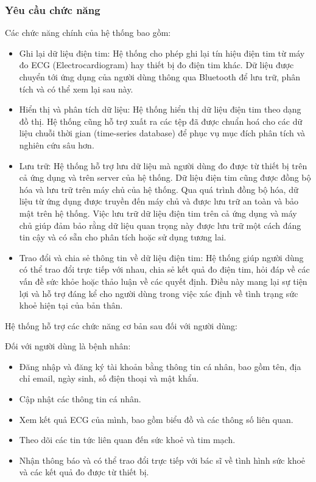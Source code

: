 \subsubsection{Yêu cầu chức năng}
Các chức năng chính của hệ thống bao gồm: 
\begin{adjustwidth}{2em}{}
  \begin{itemize}
      \item Ghi lại dữ liệu điện tim: Hệ thống cho phép ghi lại tín hiệu điện tim từ máy đo ECG (Electrocardiogram) hay thiết bị đo điện tim khác. Dữ liệu được chuyển tới ứng dụng của người dùng thông qua Bluetooth để lưu trữ, phân tích và có thể xem lại sau này.
  
      \item Hiển thị và phân tích dữ liệu: Hệ thống hiển thị dữ liệu điện tim theo dạng đồ thị. Hệ thống cũng hỗ trợ xuất ra các tệp đã được chuẩn hoá cho các dữ liệu chuỗi thời gian (time-series database) để phục vụ mục đích phân tích và nghiên cứu sâu hơn.
  
      \item Lưu trữ: Hệ thống hỗ trợ lưu dữ liệu mà người dùng đo được từ thiết bị trên cả ứng dụng và trên server của hệ thống. Dữ liệu điện tim cũng được đồng bộ hóa và lưu trữ trên máy chủ của hệ thống. Qua quá trình đồng bộ hóa, dữ liệu từ ứng dụng được truyền đến máy chủ và được lưu trữ an toàn và bảo mật trên hệ thống. Việc lưu trữ dữ liệu điện tim trên cả ứng dụng và máy chủ giúp đảm bảo rằng dữ liệu quan trọng này được lưu trữ một cách đáng tin cậy và có sẵn cho phân tích hoặc sử dụng tương lai.
  
      \item Trao đổi và chia sẻ thông tin về dữ liệu điện tim: Hệ thống giúp người dùng có thể trao đổi trực tiếp với nhau, chia sẻ kết quả đo điện tim, hỏi đáp về các vấn đề sức khỏe hoặc thảo luận về các quyết định. Điều này mang lại sự tiện lợi và hỗ trợ đáng kể cho người dùng trong việc xác định về tình trạng sức khoẻ hiện tại của bản thân.
  \end{itemize}
  \end{adjustwidth}
  
  

  
  
Hệ thống hỗ trợ các chức năng cơ bản sau đối với người dùng:

Đối với người dùng là bệnh nhân:
\begin{itemize}
    \item Đăng nhập và đăng ký tài khoản bằng thông tin cá nhân, bao gồm tên, địa chỉ email, ngày sinh, số điện thoại và mật khẩu.
    \item Cập nhật các thông tin cá nhân.
    \item Xem kết quả ECG của mình, bao gồm biểu đồ và các thông số liên quan.
    \item Theo dõi các tin tức liên quan đến sức khoẻ và tim mạch.
    \item Nhận thông báo và có thể trao đổi trực tiếp với bác sĩ về tình hình sức khoẻ và các kết quả đo được từ thiết bị.
\end{itemize}

